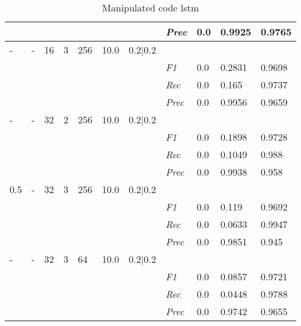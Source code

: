\begin{table}[]
\begin{tabularx}{\textwidth}{XXXXXXX|X|X|X|X}
    & & & & & & & \textit{Prec} & 0.0 & 0.9925 & 0.9765 \\ \midrule
    - & - & 16 & 3 & 256 &10.0 & 0.2|0.2 & & & & \\
    & & & & & & & \textit{F1} & 0.0 & 0.2831 & 0.9698       \\
    & & & & & & & \textit{Rec} &  0.0 & 0.165  & 0.9737  \\
    & & & & & & & \textit{Prec} & 0.0 & 0.9956 & 0.9659 \\ \midrule
    - & - & 32 & 2 & 256 &10.0 & 0.2|0.2 & & & & \\
    & & & & & & & \textit{F1} & 0.0 & 0.1898 & 0.9728       \\
    & & & & & & & \textit{Rec} &  0.0 & 0.1049  & 0.988  \\
    & & & & & & & \textit{Prec} & 0.0 & 0.9938 & 0.958 \\ \midrule
    0.5 & - & 32 & 3 & 256 &10.0 & 0.2|0.2 & & & & \\
    & & & & & & & \textit{F1} & 0.0 & 0.119 & 0.9692       \\
    & & & & & & & \textit{Rec} &  0.0 & 0.0633  & 0.9947  \\
    & & & & & & & \textit{Prec} & 0.0 & 0.9851 & 0.945 \\ \midrule
    - & - & 32 & 3 & 64 &10.0 & 0.2|0.2 & & & & \\
    & & & & & & & \textit{F1} & 0.0 & 0.0857 & 0.9721       \\
    & & & & & & & \textit{Rec} &  0.0 & 0.0448  & 0.9788  \\
    & & & & & & & \textit{Prec} & 0.0 & 0.9742 & 0.9655 \\ \midrule
    \end{tabularx}
    \caption{Manipulated code lstm}
    \label{tab:rq3_lstm}
    \end{table}